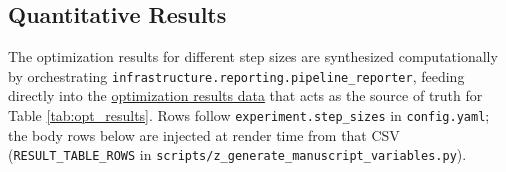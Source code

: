 \documentclass[
]{article}
\begin{document}
\subsection{Quantitative Results}\label{quantitative-results}

The optimization results for different step sizes are synthesized
computationally by orchestrating
\texttt{infrastructure.reporting.pipeline\_reporter}, feeding directly
into the
\href{https://github.com/docxology/template/blob/main/projects/code_project/output/data/optimization_results.csv}{optimization
results data} that acts as the source of truth for Table
\ref{tab:opt_results}. Rows follow \texttt{experiment.step\_sizes} in
\texttt{config.yaml}; the body rows below are injected at render time
from that CSV (\texttt{RESULT\_TABLE\_ROWS} in
\texttt{scripts/z\_generate\_manuscript\_variables.py}).
\end{document}
